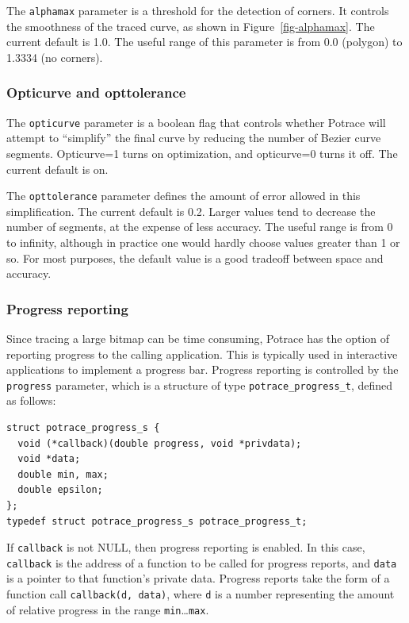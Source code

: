 \documentclass{article}
\begin{document}
The \verb!alphamax! parameter is a threshold for the detection of
corners. It controls the smoothness of the traced curve, as shown in
Figure~\ref{fig-alphamax}. The current default is 1.0.  The useful range of
this parameter is from 0.0 (polygon) to 1.3334 (no corners).

\subsubsection{Opticurve and opttolerance}

The \verb!opticurve! parameter is a boolean flag that controls whether
Potrace will attempt to ``simplify'' the final curve by reducing the
number of Bezier curve segments. Opticurve=1 turns on optimization,
and opticurve=0 turns it off. The current default is on. 

The \verb!opttolerance! parameter defines the amount of error allowed
in this simplification. The current default is 0.2. Larger values tend to
decrease the number of segments, at the expense of less accuracy.  The
useful range is from 0 to infinity, although in practice one would
hardly choose values greater than 1 or so. For most purposes, the
default value is a good tradeoff between space and accuracy.

\subsubsection{Progress reporting}

Since tracing a large bitmap can be time consuming, Potrace has the
option of reporting progress to the calling application. This is
typically used in interactive applications to implement a progress
bar. Progress reporting is controlled by the \verb!progress!
parameter, which is a structure of type \verb!potrace_progress_t!,
defined as follows:

\begin{verbatim}
struct potrace_progress_s {
  void (*callback)(double progress, void *privdata);
  void *data;      
  double min, max; 
  double epsilon;      
};
typedef struct potrace_progress_s potrace_progress_t;
\end{verbatim}

If \verb!callback! is not NULL, then progress reporting is enabled.
In this case, \verb!callback! is the address of a function to be
called for progress reports, and \verb!data! is a pointer to that
function's private data.  Progress reports take the form of a function
call \verb!callback(d, data)!, where \verb!d! is a number representing
the amount of relative progress in the range
\verb!min!\ldots\verb!max!. 
\end{document}
